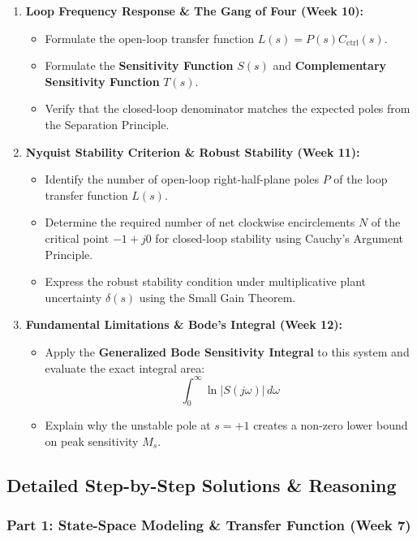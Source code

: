 \documentclass[12pt,onecolumn,twoside ]{article}
\begin{document}
\begin{enumerate}
\begin{itemize}
			\item
			Derive the dynamic feedback compensator transfer function $C_{\text{ctrl}}(s) = \frac{U(s)}{-Y(s)}$.
		\end{itemize}
		\item
		\textbf{Loop Frequency Response \& The Gang of Four (Week 10):}
		\begin{itemize}
			\item
			Formulate the open-loop transfer function $L(s) = P(s)C_{\text{ctrl}}(s)$.
			\item
			Formulate the \textbf{Sensitivity Function} $S(s)$ and \textbf{Complementary Sensitivity Function} $T(s)$.
			\item
			Verify that the closed-loop denominator matches the expected poles from the Separation Principle.
		\end{itemize}
		\item
		\textbf{Nyquist Stability Criterion \& Robust Stability (Week 11):}
		\begin{itemize}
			\item
			Identify the number of open-loop right-half-plane poles $P$ of the loop transfer function $L(s)$.
			\item
			Determine the required number of net clockwise encirclements $N$ of the critical point $-1 + j0$ for closed-loop stability using Cauchy's Argument Principle.
			\item
			Express the robust stability condition under multiplicative plant uncertainty $\delta(s)$ using the Small Gain Theorem.
		\end{itemize}
		\item
		\textbf{Fundamental Limitations \& Bode's Integral (Week 12):}
		\begin{itemize}
			\item
			Apply the \textbf{Generalized Bode Sensitivity Integral} to this system and evaluate the exact integral area: \[
			\int_{0}^{\infty} \ln |S(j\omega)|\, d\omega
			\]
			\item
			Explain why the unstable pole at $s = +1$ creates a non-zero lower bound on peak sensitivity $M_s$.
		\end{itemize}
	\end{enumerate}
	
	\subsection{Detailed Step-by-Step Solutions \& Reasoning}
	
	\subsubsection{Part 1: State-Space Modeling \& Transfer Function (Week 7)}
\end{document}
